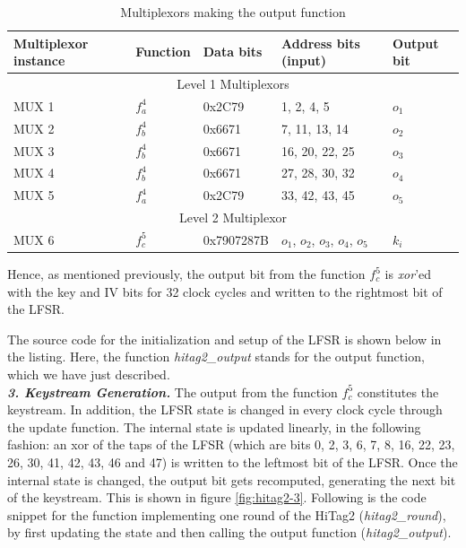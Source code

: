 \begin{table}[ht!]
\begin{center}
\small{
\begin{tabular}{|p{2.2cm}|l|p{2cm}|p{2.8cm}|p{1.5cm}|}
\hline 
\textbf{Multiplexor instance}	& \textbf{Function}		& \textbf{Data bits}	& \textbf{Address bits (input)}		& \textbf{Output bit}\\ \hline \hline
\multicolumn{5}{|c|}{Level 1 Multiplexors}\\ \hline \hline
MUX 1 			&	$f_a^4$			& 0x2C79			& 1, 2, 4, 5							& $o_1$\\
MUX 2 			&	$f_b^4$			& 0x6671			& 7, 11, 13, 14						& $o_2$\\
MUX 3 			&	$f_b^4$			& 0x6671			& 16, 20, 22, 25					& $o_3$\\
MUX 4 			&	$f_b^4$			& 0x6671			& 27, 28, 30, 32					& $o_4$\\
MUX 5 			&	$f_a^4$			& 0x2C79			& 33, 42, 43, 45					& $o_5$\\ \hline \hline
\multicolumn{5}{|c|}{Level 2 Multiplexor}\\ \hline \hline
MUX 6 			&	$f_c^5$			& 0x7907287B	& $o_1$, $o_2$, $o_3$, $o_4$, $o_5$		& $k_i$\\ \hline
\end{tabular}}
\end{center}
\caption{Multiplexors making the output function}
\label{tab:muxs}
\end{table}

Hence, as mentioned previously, the output bit from the function $f_c^5$ is \emph{xor}'ed with the key and IV bits for 32 clock cycles and written to the rightmost bit of the LFSR.

The source code for the initialization and setup of the LFSR is shown below in the listing. Here, the function \emph{hitag2\_output} stands for the output function, which we have just described.\\




\textit{\textbf{3. Keystream Generation.}} The output from the function $f_c^5$ constitutes the keystream. In addition, the LFSR state is changed in every clock cycle through the update function. The internal state is updated linearly, in the following fashion: an xor of the taps of the LFSR (which are bits 0, 2, 3, 6, 7, 8, 16, 22, 23, 26, 30, 41, 42, 43, 46 and 47) is written to the leftmost bit of the LFSR. Once the internal state is changed, the output bit gets recomputed, generating the next bit of the keystream. This is shown in figure \ref{fig:hitag2-3}. Following is the code snippet for the function implementing one round of the HiTag2 (\emph{hitag2\_round}), by first updating the state and then calling the output function (\emph{hitag2\_output}).\\

